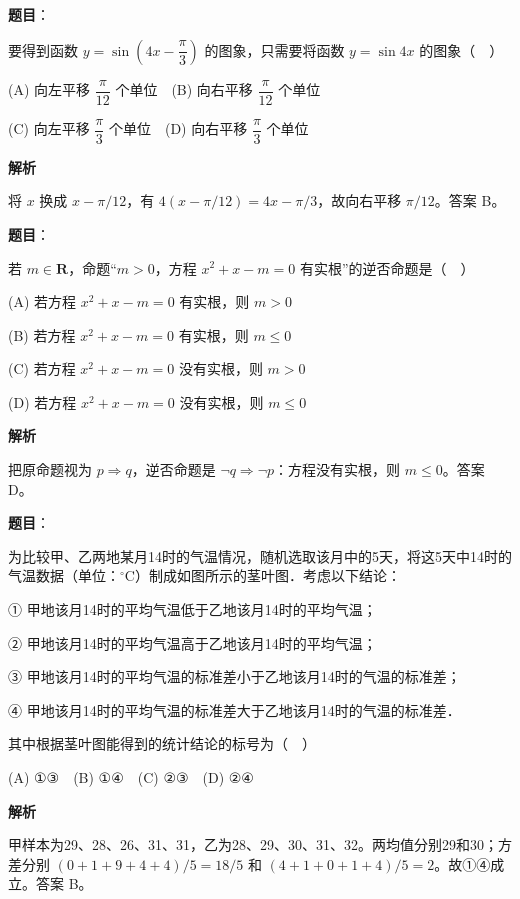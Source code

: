 \begin{answer}

\textbf{题目}：

要得到函数 \(y=\sin\left(4x-\dfrac{\pi}{3}\right)\) 的图象，只需要将函数 \(y=\sin4x\) 的图象（　）

(A) 向左平移 \(\dfrac{\pi}{12}\) 个单位　(B) 向右平移 \(\dfrac{\pi}{12}\) 个单位

(C) 向左平移 \(\dfrac{\pi}{3}\) 个单位　(D) 向右平移 \(\dfrac{\pi}{3}\) 个单位

\textbf{解析}

将 \(x\) 换成 \(x-\pi/12\)，有 \(4(x-\pi/12)=4x-\pi/3\)，故向右平移 \(\pi/12\)。答案 B。


\end{answer}
\begin{answer}

\textbf{题目}：

若 \(m\in\mathbf{R}\)，命题“\(m>0\)，方程 \(x^2+x-m=0\) 有实根”的逆否命题是（　）

(A) 若方程 \(x^2+x-m=0\) 有实根，则 \(m>0\)

(B) 若方程 \(x^2+x-m=0\) 有实根，则 \(m\leqslant0\)

(C) 若方程 \(x^2+x-m=0\) 没有实根，则 \(m>0\)

(D) 若方程 \(x^2+x-m=0\) 没有实根，则 \(m\leqslant0\)

\textbf{解析}

把原命题视为 \(p\Rightarrow q\)，逆否命题是 \(\neg q\Rightarrow\neg p\)：方程没有实根，则 \(m\leqslant0\)。答案 D。


\end{answer}
\begin{answer}

\textbf{题目}：

为比较甲、乙两地某月14时的气温情况，随机选取该月中的5天，将这5天中14时的气温数据（单位：\(^{\circ}\mathrm{C}\)）制成如图所示的茎叶图．考虑以下结论：
\nopagebreak[4]
\begin{center}\end{center}
\nopagebreak[4]
① 甲地该月14时的平均气温低于乙地该月14时的平均气温；

② 甲地该月14时的平均气温高于乙地该月14时的平均气温；

③ 甲地该月14时的平均气温的标准差小于乙地该月14时的气温的标准差；

④ 甲地该月14时的平均气温的标准差大于乙地该月14时的气温的标准差．

其中根据茎叶图能得到的统计结论的标号为（　）

(A) ①③　(B) ①④　(C) ②③　(D) ②④

\textbf{解析}

甲样本为29、28、26、31、31，乙为28、29、30、31、32。两均值分别29和30；方差分别 \((0+1+9+4+4)/5=18/5\) 和 \((4+1+0+1+4)/5=2\)。故①④成立。答案 B。


\end{answer}
